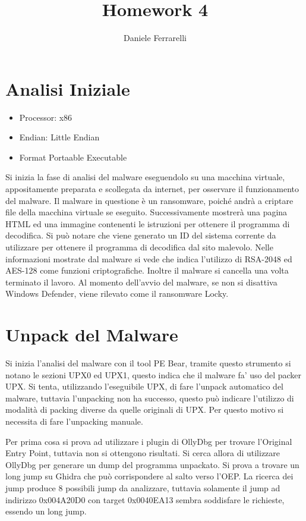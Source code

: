 \documentclass[a4paper,12pt]{article}
\title{Homework 4}
\author{Daniele Ferrarelli}
\date{}
\begin{document}
\maketitle
\tableofcontents

\section{Analisi Iniziale}
\begin{itemize}
	\item Processor: x86
	\item Endian: Little Endian
	\item Format Portaable Executable
\end{itemize}

Si inizia la fase di analisi del malware eseguendolo su una macchina virtuale, appositamente preparata e scollegata  da internet, per osservare il funzionamento del malware. Il malware in questione è un ransomware, poiché andrà a criptare file della macchina virtuale se eseguito. Successivamente mostrerà una pagina HTML ed una immagine contenenti le istruzioni per ottenere il programma di decodifica. Si può notare che viene generato un ID del sistema corrente da utilizzare per ottenere il programma di decodifica dal sito malevolo. Nelle informazioni mostrate dal malware si vede che indica l'utilizzo di RSA-2048 ed AES-128 come funzioni criptografiche.  Inoltre il malware si cancella una volta terminato il lavoro. Al momento dell'avvio del malware, se non si disattiva Windows Defender, viene rilevato come il ransomware Locky. 

\section{Unpack del Malware}
Si inizia l'analisi del malware con il tool PE Bear, tramite questo strumento si notano le sezioni UPX0 ed UPX1, questo indica che il malware fa' uso del packer UPX. Si tenta, utilizzando l'eseguibile UPX, di fare l'unpack automatico del malware, tuttavia l'unpacking non ha successo, questo può indicare l'utilizzo di modalità di packing diverse da quelle originali di UPX. Per questo motivo si necessita di fare l'unpacking manuale.

Per prima cosa si prova ad utilizzare i plugin di OllyDbg per trovare l'Original Entry Point, tuttavia non si ottengono risultati.
Si cerca allora di utilizzare OllyDbg per generare un dump del programma unpackato. Si prova a trovare un long jump su Ghidra che può corrispondere al salto verso l'OEP. La ricerca dei jump produce 8 possibili jump da analizzare, tuttavia solamente il jump ad indirizzo 0x004A20D0 con target 0x0040EA13 sembra soddisfare le richieste, essendo un long jump. 
\end{document}
